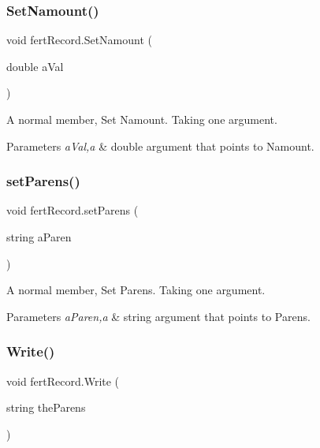 \subsubsection{\texorpdfstring{SetNamount()}{SetNamount()}}
{\footnotesize\ttfamily void fert\+Record.\+Set\+Namount (\begin{DoxyParamCaption}\item[{double}]{a\+Val }\end{DoxyParamCaption})\hspace{0.3cm}{\ttfamily [inline]}}



A normal member, Set Namount. Taking one argument. 


\begin{DoxyParams}{Parameters}
{\em a\+Val,a} & double argument that points to Namount. \\
\hline
\end{DoxyParams}
\mbox{\label{classfert_record_a483b96d7e9e7255592c19e431753802d}} 
\subsubsection{\texorpdfstring{setParens()}{setParens()}}
{\footnotesize\ttfamily void fert\+Record.\+set\+Parens (\begin{DoxyParamCaption}\item[{string}]{a\+Paren }\end{DoxyParamCaption})\hspace{0.3cm}{\ttfamily [inline]}}



A normal member, Set Parens. Taking one argument. 


\begin{DoxyParams}{Parameters}
{\em a\+Paren,a} & string argument that points to Parens. \\
\hline
\end{DoxyParams}
\mbox{\label{classfert_record_a1c2c1943addbb5f6eb5e3fe244fa585b}} 
\subsubsection{\texorpdfstring{Write()}{Write()}}
{\footnotesize\ttfamily void fert\+Record.\+Write (\begin{DoxyParamCaption}\item[{string}]{the\+Parens }\end{DoxyParamCaption})\hspace{0.3cm}{\ttfamily [inline]}}



